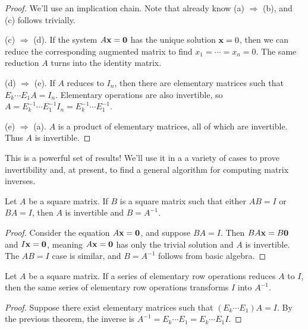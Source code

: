 \documentclass[../m073main.tex]{subfiles}
\begin{document}
\begin{proof}
	We'll use an implication chain.
	Note that already know (a) $\Rightarrow$ (b), and (c) follows trivially.

	(c) $\Rightarrow$ (d).
	If the system $A \mathbf{x} = \mathbf{0}$ has the unique solution $\mathbf{x} = 0$, then we can reduce the corresponding augmented matrix to find $x_1 = \cdots = x_n = 0$.
	The same reduction $A$ turns into the identity matrix.

	(d) $\Rightarrow$ (e).
	If $A$ reduces to $I_n$, then there are elementary matrices such that $E_k \cdots E_1 A = I_n$.
	Elementary operations are also invertible, so $A = E_k^{-1} \cdots E_1^{-1} I_n = E_k^{-1} \cdots E_1^{-1}$.

	(e) $\Rightarrow$ (a).
	$A$ is a product of elementary matrices, all of which are invertible.
	Thus $A$ is invertible.
\end{proof}

This is a powerful set of results!
We'll use it in a a variety of cases to prove invertibility and, at present, to find a general algorithm for computing matrix inverses.

\begin{theorem}
	Let $A$ be a square matrix.
	If $B$ is a square matrix such that either $AB = I$ or $BA = I$, then $A$ is invertible and $B = A^{-1}$.
\end{theorem}

\begin{proof}
	Consider the equation $A \mathbf{x} = \mathbf{0}$, and suppose $BA = I$.
	Then $BA \mathbf{x} = B \mathbf{0}$ and $I \mathbf{x} = \mathbf{0}$, meaning $A \mathbf{x} = \mathbf{0}$ has only the trivial solution and $A$ is invertible.
	The $AB = I$ case is similar, and $B = A^{-1}$ follows from basic algebra.
\end{proof}

\begin{theorem}
	Let $A$ be a square matrix.
	If a series of elementary row operations reduces $A$ to $I$, then the same series of elementary row operations transforms $I$ into $A^{-1}$.
\end{theorem}

\begin{proof}
	Suppose there exist elementary matrices such that $(E_k \cdots E_1) A = I$.
	By the previous theorem, the inverse is $A^{-1} = E_k \cdots E_1 = E_k \cdots E_1 I$.
\end{proof}
\end{document}
